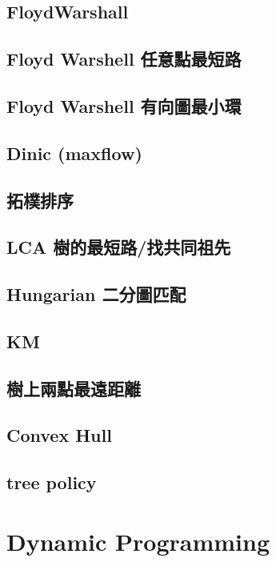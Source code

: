 \subsection{FloydWarshall}

\subsection{Floyd Warshell 任意點最短路}

\subsection{Floyd Warshell 有向圖最小環}

\subsection{Dinic (maxflow)}

\subsection{拓樸排序}

\subsection{LCA 樹的最短路/找共同祖先}

\subsection{Hungarian 二分圖匹配}

\subsection{KM}

\subsection{樹上兩點最遠距離}

\subsection{Convex Hull}

\subsection{tree policy}


\section{Dynamic Programming}
